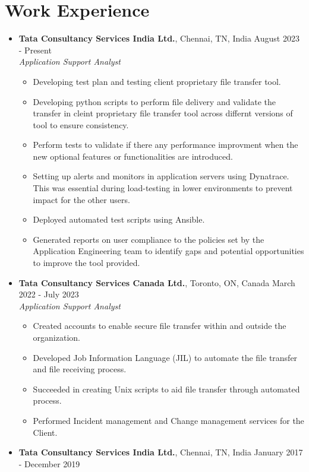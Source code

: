 \documentclass{article}
\begin{document}
	\section*{Work Experience \hrulefill\vspace{-.3\baselineskip}}
	\begin{itemize}
		\item \textbf{Tata Consultancy Services India Ltd.}, Chennai, TN, India \hfill August 2023 - Present\\
		\textit{Application Support Analyst}
		\begin{itemize}
			\item Developing test plan and testing client proprietary file transfer tool.
			\item Developing python scripts to perform file delivery and validate the transfer in cleint proprietary file transfer tool across differnt versions of tool to ensure consistency.
			\item Perform tests to validate if there any performance improvment when the new optional features or functionalities are introduced.
			\item Setting up alerts and monitors in application servers using Dynatrace. This was essential during load-testing in lower environments to prevent impact for the other users.
			\item Deployed automated test scripts using Ansible.
			\item Generated reports on user compliance to the policies set by the Application Engineering team to identify gaps and potential opportunities to improve the tool provided.
		\end{itemize}
		\item \textbf{Tata Consultancy Services Canada Ltd.}, Toronto, ON, Canada \hfill March 2022 - July 2023\\
		\textit{Application Support Analyst}
		\begin{itemize}
			\item Created accounts to enable secure file transfer within and outside the organization.
			\item Developed Job Information Language (JIL) to automate the file transfer and file receiving process.
			\item Succeeded in creating Unix scripts to aid file transfer through automated process.
			\item Performed Incident management and Change management services for the Client.
		\end{itemize}
		\item \textbf{Tata Consultancy Services India Ltd.}, Chennai, TN, India \hfill January 2017 - December 2019\\

\end{itemize}
\end{document}
